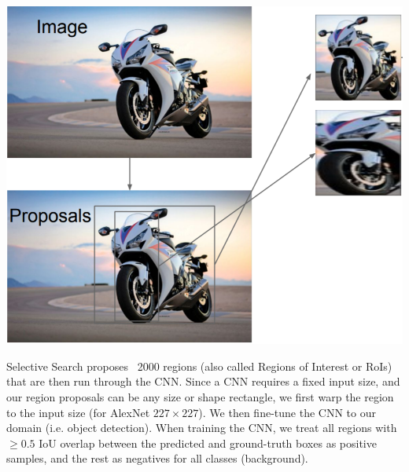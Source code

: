 \documentclass{article}
\begin{document}
\begin{center}
\includegraphics[scale=0.4]{warp.PNG}
\end{center}


Selective Search proposes ~2000 regions (also called Regions of Interest or RoIs) that are then run through the CNN. Since a CNN requires a fixed input size, and our region proposals can be any size or shape rectangle, we first warp the region to the input size (for AlexNet $227\times227$). We then fine-tune the CNN to our domain (i.e. object detection). When training the CNN, we treat all regions with $\geq 0.5$ IoU overlap between the predicted and ground-truth boxes as positive samples, and the rest as negatives for all classes (background).
\end{document}
